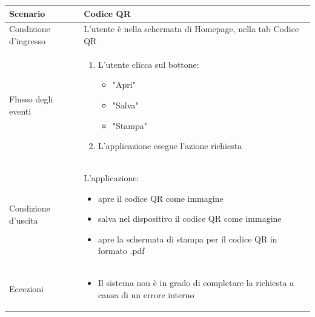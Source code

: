 \documentclass[12pt,a4paper,twoside,openright,titlepage]{book}
\begin{document}
\begin{table}[H]
\centering
\begin{tabular}{|p{4cm}|p{10cm}|}
\hline
Scenario & Codice QR \\
\hline
Condizione d'ingresso & L'utente è nella schermata di Homepage, nella tab Codice QR\\
\hline
Flusso degli eventi & 
\begin{enumerate}
\item L'utente clicca sul bottone:
\begin{itemize}
\item "Apri"
\item "Salva"
\item "Stampa"
\end{itemize}
\item L'applicazione esegue l'azione richiesta
\end{enumerate}\\
\hline
Condizione d'uscita & L'applicazione:
\begin{itemize}
\item apre il codice QR come immagine
\item salva nel dispositivo il codice QR come immagine
\item apre la schermata di stampa per il codice QR in formato .pdf
\end{itemize}\\
\hline
Eccezioni & 
\begin{itemize}
\item Il sistema non è in grado di completare la richiesta a causa di un errore interno
\end{itemize} \\
\hline
\end{tabular}
\end{table}
\end{document}

